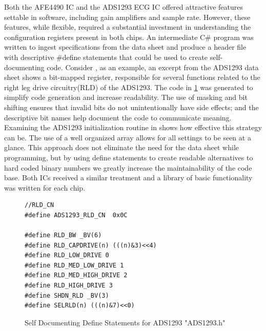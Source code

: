 Both the AFE4490  IC and the ADS1293 ECG IC offered attractive features settable in software, including gain amplifiers and sample rate. However, these features, while flexible, required a substantial investment in understanding the configuration registers present in both chips. An intermediate C\# program was written to ingest specifications from the data sheet and produce a header file with descriptive \#define statements that could be used to create self-documenting code. Consider , as an example, an excerpt from the ADS1293 data sheet shows a  bit-mapped register, responsible for several functions related to the right leg drive circuitry(RLD) of the ADS1293. The code in \cref{fig:ADS1293_Defines} was generated to simplify code generation and increase readability. The use of masking and bit shifting ensures that invalid bits do not unintentionally have side effects; and the descriptive bit names help document the code to communicate meaning. Examining the ADS1293 initialization routine in  shows how effective this strategy can be. The use of a well organized array allows for all settings to be seen at a glance. This approach does not eliminate the need for the data sheet while programming, but by using define statements to create readable alternatives to hard coded binary numbers we greatly increase the maintainability of the code base. Both ICs received a similar treatment and a library of basic functionality was written for each chip.

\begin{figure}
	\begin{center}
		\label{fig:ADS1293_Defines}
\begin{lstlisting}[frame=single]
//RLD_CN
#define ADS1293_RLD_CN  0x0C

#define RLD_BW _BV(6)
#define RLD_CAPDRIVE(n) (((n)&3)<<4)
#define RLD_LOW_DRIVE 0
#define RLD_MED_LOW_DRIVE 1
#define RLD_MED_HIGH_DRIVE 2
#define RLD_HIGH_DRIVE 3
#define SHDN_RLD _BV(3)
#define SELRLD(n) (((n)&7)<<0)
\end{lstlisting}
		\caption{Self Documenting Define Statements for ADS1293 "ADS1293.h"}
	\end{center}
\end{figure}


